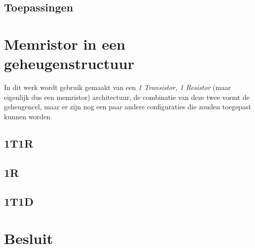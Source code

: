 \subsection{Toepassingen}


\section{Memristor in een geheugenstructuur}

In dit werk wordt gebruik gemaakt van een \emph{1 Transistor, 1 Resistor} (maar eigenlijk dus een memristor) architectuur, de combinatie van deze twee vormt de geheugencel, maar er zijn nog een paar andere configuraties die zouden toegepast kunnen worden.

\subsection{1T1R}

\subsection{1R}

\subsection{1T1D}



\section{Besluit}

